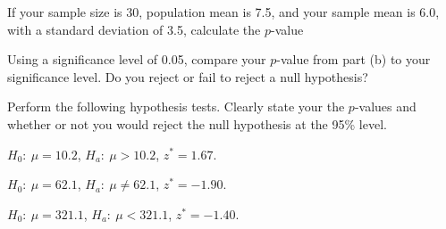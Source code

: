 \begin{problem}
\begin{subproblem}
  \item If your sample size is 30, population mean is 7.5, and your
    sample mean is 6.0, with a standard deviation of 3.5, calculate the
    $p$-value

    \vfill

  \item Using a significance level of 0.05, compare your $p$-value from
    part (b) to your significance level. Do you reject or fail to
    reject a null hypothesis?

    \vfill

  \end{subproblem}


\clearpage

\item Perform the following hypothesis tests. Clearly state your
  the $p$-values and whether or not you would reject the null
  hypothesis at the 95\% level.

  \begin{subproblem}
    \item $H_0: ~ \mu=10.2$, $H_a: ~ \mu > 10.2$, $z^*=1.67$.
      \vfill

    \item $H_0: ~ \mu=62.1$, $H_a: ~ \mu \neq 62.1$, $z^*=-1.90$.

      \vfill

    \item $H_0: ~ \mu=321.1$, $H_a: ~ \mu < 321.1$, $z^*=-1.40$.

      \vfill

  \end{subproblem}


\end{problem}


